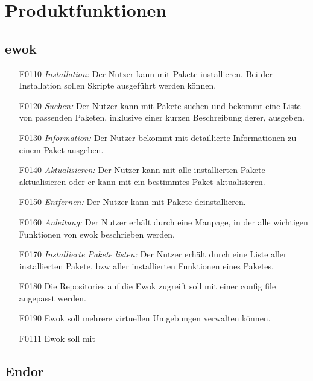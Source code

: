 \chapter{Produktfunktionen}

\section{ewok}

\begin{itemize}
	\item[F0110] \textit{Installation:} Der Nutzer kann mit  Pakete installieren. Bei der Installation sollen Skripte ausgeführt werden können.
	\item[F0120] \textit{Suchen:} Der Nutzer kann mit  Pakete suchen und bekommt eine Liste von passenden Paketen, inklusive einer kurzen Beschreibung derer, ausgeben.
	\item[F0130] \textit{Information:} Der Nutzer bekommt mit  detaillierte Informationen zu einem Paket ausgeben.
	\item[F0140] \textit{Aktualisieren:} Der Nutzer kann mit  alle installierten Pakete aktualisieren oder er kann mit  ein bestimmtes Paket aktualisieren.
	\item[F0150] \textit{Entfernen:} Der Nutzer kann mit  Pakete deinstallieren.
	\item[F0160] \textit{Anleitung:} Der Nutzer erhält durch  eine Manpage, in der alle wichtigen Funktionen von ewok beschrieben werden.
	\item[F0170] \textit{Installierte Pakete listen:} Der Nutzer erhält durch  eine Liste aller installierten Pakete, bzw aller installierten Funktionen eines Paketes.
	\item[F0180] Die Repositories auf die Ewok zugreift soll mit einer config file angepasst werden.
	\item[F0190] Ewok soll mehrere virtuellen Umgebungen verwalten können. 
	\item[F0111] Ewok soll mit 	
\end{itemize}

\section{Endor}

